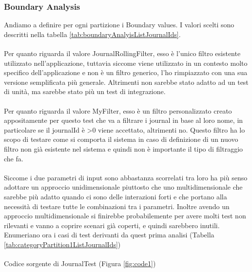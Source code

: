 \documentclass[10pt, a4paper]{article}
\begin{document}
\subsubsection{Boundary Analysis}
Andiamo a definire per ogni partizione i Boundary values. I valori scelti sono 
descritti nella tabella \ref{tab:boundaryAnalyisListJournalIds}. \\ \\
Per quanto riguarda il valore JournalRollingFilter, esso è l'unico filtro esistente utilizzato nell'applicazione, 
tuttavia siccome viene utilizzato in un contesto molto specifico dell'applicazione e non è un filtro generico, l'ho rimpiazzato
con una sua versione semplificata più generale. Altrimenti non sarebbe stato adatto ad un test di unità, ma sarebbe stato 
più un test di integrazione. \\ \\
Per quanto riguarda il valore MyFilter, esso è un filtro personalizzato creato appositamente per questo test che va a filtrare i journal
in base al loro nome, in particolare se il journalId è \textgreater 0 viene accettato, altrimenti no. 
Questo filtro ha lo scopo di testare come si comporta il sistema in caso di definizione di un nuovo filtro non già esistente 
nel sistema e quindi non è importante il tipo di filtraggio che fa. \\ \\
Siccome i due parametri di input sono abbastanza scorrelati tra loro ha più senso adottare un approccio 
unidimensionale piuttosto che uno multidimensionale che sarebbe più adatto quando ci sono delle interazioni forti
e che portano alla necessità di testare tutte le combinazioni tra i parametri. Inoltre avendo un approccio multidimensionale
si finirebbe probabilemente per avere molti test non rilevanti e vanno a coprire scenari già coperti, e quindi sarebbero inutili.
\\ Enumeriano ora i casi di test derivanti da quest prima analisi (Tabella \ref{tab:categoryPartition1ListJournalIds}) \\ \\
Codice sorgente di JournalTest (Figura \ref{fig:code1})
\end{document}
